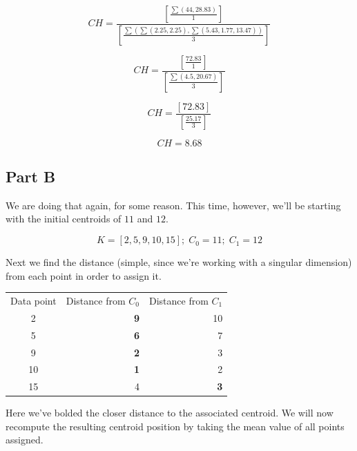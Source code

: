 \documentclass{article}
\begin{document}
\begin{equation}
    CH = \frac{\left\lbrack \frac{\sum (44, 28.83)}{1} \right\rbrack} { \left\lbrack \frac{\sum (\sum (2.25, 2.25), \sum(5.43, 1.77, 13.47) )}{3} \right\rbrack}
\end{equation}

\begin{equation}
    CH = \frac{\left\lbrack \frac{72.83}{1} \right\rbrack} { \left\lbrack \frac{\sum(4.5, 20.67)}{3} \right\rbrack}
\end{equation}

\begin{equation}
    CH = \frac{\left\lbrack 72.83 \right\rbrack} { \left\lbrack \frac{25.17}{3} \right\rbrack}
\end{equation}

\begin{equation}
    CH = 8.68
\end{equation}

\subsection*{Part B}

We are doing that again, for some reason. This time, however, we'll be starting with the initial centroids of $11$ and $12$.


\begin{equation}
    K = [2, 5, 9, 10, 15];\; C_0 = 11;\;  C_1 = 12
\end{equation}

\noindent Next we find the distance (simple, since we're working with a singular dimension) from each point in order to assign it.

\begin{center}
    \begin{tabular}{c r r}
        Data point & Distance from $C_0$ & Distance from $C_1$\\
        2 & \textbf{9} & 10 \\
        5 & \textbf{6} & 7 \\
        9 & \textbf{2} & 3 \\
        10 & \textbf{1} & 2 \\
        15 & 4 & \textbf{3} \\
    \end{tabular}
\end{center}

\noindent Here we've bolded the closer distance to the associated centroid. We will now recompute the resulting centroid position by taking the mean value of all points assigned.
\end{document}
